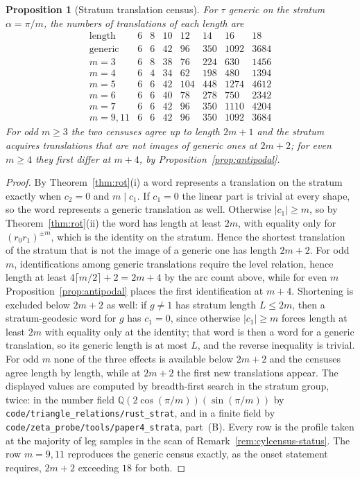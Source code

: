 \documentclass[11pt]{article}
\newtheorem{proposition}[theorem]{Proposition}
\theoremstyle{definition}
\theoremstyle{remark}
\newcommand{\Q}{\mathbb{Q}}
\begin{document}
\begin{proposition}[Stratum translation census]\label{prop:cylcensus}
For $\tau$ generic on the stratum $\alpha=\pi/m$, the numbers of translations
of each length are
\[
\begin{array}{r|rrrrrrr}
 \text{length} & 6&8&10&12&14&16&18\\\hline
 \text{generic} & 6&6&42&96&350&1092&3684\\
 m=3 & 6&8&38&76&224&630&1456\\
 m=4 & 6&4&34&62&198&480&1394\\
 m=5 & 6&6&42&104&448&1274&4612\\
 m=6 & 6&6&40&78&278&750&2342\\
 m=7 & 6&6&42&96&350&1110&4204\\
 m=9,11 & 6&6&42&96&350&1092&3684
\end{array}
\]
For odd $m\ge3$ the two censuses agree up to length $2m+1$ and the stratum
acquires translations that are not images of generic ones at $2m+2$; for even
$m\ge4$ they first differ at $m+4$, by Proposition~\ref{prop:antipodal}.
\end{proposition}

\begin{proof}
By Theorem~\ref{thm:rot}(i) a word represents a translation on the stratum
exactly when $c_2=0$ and $m\mid c_1$. If $c_1=0$ the linear part is trivial at
every shape, so the word represents a generic translation as well. Otherwise
$|c_1|\ge m$, so by Theorem~\ref{thm:rot}(ii) the word has length at least
$2m$, with equality only for $(r_0r_1)^{\pm m}$, which is the identity on the
stratum. Hence the shortest translation of the stratum that is not the image
of a generic one has length $2m+2$. For odd $m$, identifications among generic
translations require the level relation, hence length at least
$4\lceil m/2\rceil+2=2m+4$ by the arc count above, while for even $m$
Proposition~\ref{prop:antipodal} places the first identification at $m+4$.
Shortening is excluded below $2m+2$ as well: if $g\neq1$ has stratum length
$L\le2m$, then a stratum-geodesic word for $g$ has $c_1=0$, since otherwise
$|c_1|\ge m$ forces length at least $2m$ with equality only at the identity;
that word is then a word for a generic translation, so its generic length is at
most $L$, and the reverse inequality is trivial. For odd $m$ none of the three
effects is available below $2m+2$ and the censuses agree length by length,
while at $2m+2$ the first new translations appear. The displayed values are
computed by breadth-first search in the stratum group, twice: in the number
field $\Q(2\cos(\pi/m))(\sin(\pi/m))$ by
\texttt{code/triangle\_relations/rust\_strat}, and in a finite field by
\texttt{code/zeta\_probe/tools/paper4\_strata}, part~(B). Every row is the
profile taken at the majority of leg samples in the scan of
Remark~\ref{rem:cylcensus-status}. The row $m=9,11$
reproduces the generic census exactly, as the onset statement requires, $2m+2$
exceeding $18$ for both.
\end{proof}
\end{document}
